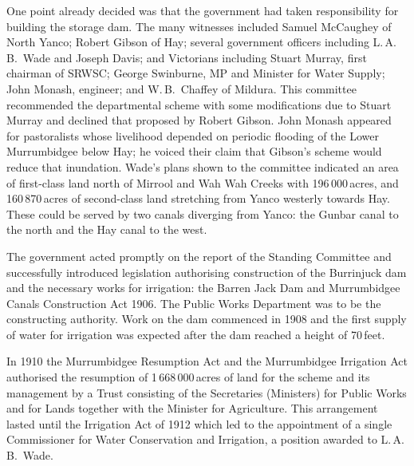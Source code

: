 One point already decided was that the government had taken
responsibility for building the storage dam.  The many witnesses
included Samuel McCaughey of North Yanco; Robert Gibson of Hay;
several government officers including L.\,A.\,B.~Wade and Joseph
Davis; and Victorians including Stuart Murray, first chairman of
SRWSC; George Swinburne, MP and Minister for Water Supply; John
Monash, engineer; and W.\,B.~Chaffey of Mildura. This committee
recommended the departmental scheme with some modifications due to
Stuart Murray and declined that proposed by Robert Gibson.  John
Monash appeared for pastoralists whose livelihood depended on periodic
flooding of the Lower Murrumbidgee below Hay; he voiced their claim
that Gibson's scheme would reduce that inundation.  Wade's plans shown
to the committee indicated an area of first-class land north of
Mirrool and Wah Wah Creeks with 196\,000\,acres, and 160\,870\,acres
of second-class land stretching from Yanco westerly towards Hay. These
could be served by two canals diverging from Yanco: the Gunbar canal
 to the north and the Hay canal  to the
west.

The government acted promptly on the report of the Standing Committee
and successfully introduced legislation authorising construction of
the Burrinjuck dam and the necessary works for irrigation: the Barren
Jack Dam and Murrumbidgee Canals Construction Act 1906.  The Public
Works Department was to be the constructing authority.  Work on the
dam commenced in 1908 and the first supply of water for irrigation was
expected after the dam reached a height of
70\,feet.

In 1910 the Murrumbidgee Resumption Act and the Murrumbidgee
Irrigation Act authorised the resumption of 1\,668\,000\,acres of land
for the scheme and its management by a Trust consisting of the
Secretaries (Ministers) for Public Works and for Lands together with
the Minister for Agriculture. This arrangement lasted until the
Irrigation Act of 1912 which led to the appointment of a single
Commissioner for Water Conservation and Irrigation, a position awarded
to L.\,A.\,B.~Wade.\fn{\citet[p.\,127]{frith1974}.}

